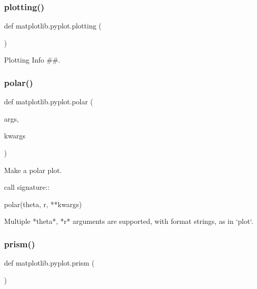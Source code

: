 \mbox{\label{namespacematplotlib_1_1pyplot_a14828f067be9210c6de273069d27e091}} 
\subsubsection{\texorpdfstring{plotting()}{plotting()}}
{\footnotesize\ttfamily def matplotlib.\+pyplot.\+plotting (\begin{DoxyParamCaption}{ }\end{DoxyParamCaption})}



Plotting Info \#\#. 

\mbox{\label{namespacematplotlib_1_1pyplot_a61f89e91655ed628a676ff105a030142}} 
\subsubsection{\texorpdfstring{polar()}{polar()}}
{\footnotesize\ttfamily def matplotlib.\+pyplot.\+polar (\begin{DoxyParamCaption}\item[{}]{args,  }\item[{}]{kwargs }\end{DoxyParamCaption})}

\begin{DoxyVerb}Make a polar plot.

call signature::

  polar(theta, r, **kwargs)

Multiple *theta*, *r* arguments are supported, with format strings, as in
`plot`.
\end{DoxyVerb}
 \mbox{\label{namespacematplotlib_1_1pyplot_a7623a59d6cfbe9a51ce3c8f2132bc926}} 
\subsubsection{\texorpdfstring{prism()}{prism()}}
{\footnotesize\ttfamily def matplotlib.\+pyplot.\+prism (\begin{DoxyParamCaption}{ }\end{DoxyParamCaption})}

